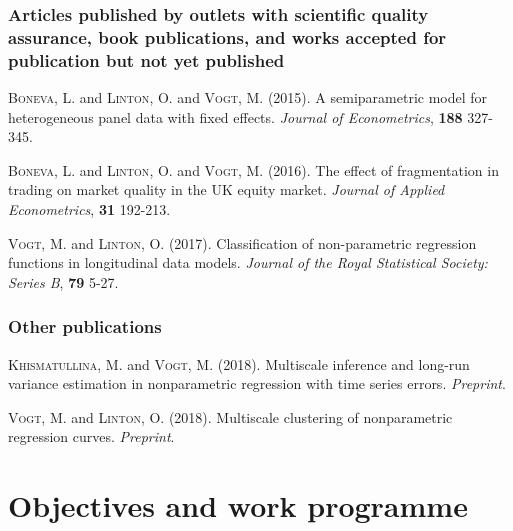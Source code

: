 \documentclass[a4paper,12pt]{article}
\begin{document}
\subsubsection{Articles published by outlets with scientific quality assurance, book publications, and works accepted for publication but not yet published}


{\small

\hangindent=0.4cm \textsc{Boneva}, L. and \textsc{Linton}, O. and \textsc{Vogt}, M. (2015). A semiparametric model for heterogeneous panel data with fixed effects. \textit{Journal of Econometrics}, \textbf{188} 327-345.

\vspace{5pt}

\noindent \hangindent=0.4cm \textsc{Boneva}, L. and \textsc{Linton}, O. and \textsc{Vogt}, M. (2016). The effect of fragmentation in trading on market quality in the UK equity market. \textit{Journal of Applied Econometrics}, \textbf{31} 192-213.

\vspace{5pt}

\noindent \hangindent=0.4cm \textsc{Vogt}, M. and \textsc{Linton}, O. (2017). Classification of non-parametric regression functions in longitudinal data models. \textit{Journal of the Royal Statistical Society: Series B}, \textbf{79} 5-27.

}


\subsubsection{Other publications}


{\small

\hangindent=0.4cm \textsc{Khismatullina}, M. and \textsc{Vogt}, M. (2018). Multiscale inference and long-run variance estimation in nonparametric regression with time series errors. \textit{Preprint}.

\vspace{5pt}

\noindent \hangindent=0.4cm \textsc{Vogt}, M. and \textsc{Linton}, O. (2018). Multiscale clustering of nonparametric regression curves. \textit{Preprint}. 

}



\section{Objectives and work programme}
\end{document}
